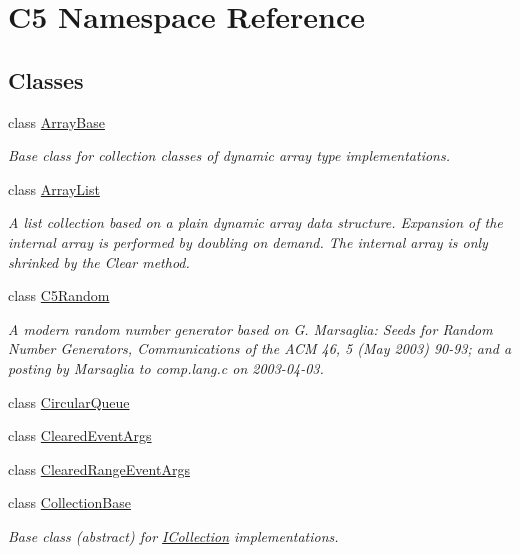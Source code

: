 \hypertarget{namespace_c5}{}\section{C5 Namespace Reference}
\label{namespace_c5}
\subsection*{Classes}
\begin{DoxyCompactItemize}
\item 
class \hyperlink{class_c5_1_1_array_base}{Array\+Base}
\begin{DoxyCompactList}\small\item\em Base class for collection classes of dynamic array type implementations. \end{DoxyCompactList}\item 
class \hyperlink{class_c5_1_1_array_list}{Array\+List}
\begin{DoxyCompactList}\small\item\em A list collection based on a plain dynamic array data structure. Expansion of the internal array is performed by doubling on demand. The internal array is only shrinked by the Clear method. \end{DoxyCompactList}\item 
class \hyperlink{class_c5_1_1_c5_random}{C5\+Random}
\begin{DoxyCompactList}\small\item\em A modern random number generator based on G. Marsaglia\+: Seeds for Random Number Generators, Communications of the A\+C\+M 46, 5 (May 2003) 90-\/93; and a posting by Marsaglia to comp.\+lang.\+c on 2003-\/04-\/03. \end{DoxyCompactList}\item 
class \hyperlink{class_c5_1_1_circular_queue}{Circular\+Queue}
\item 
class \hyperlink{class_c5_1_1_cleared_event_args}{Cleared\+Event\+Args}
\item 
class \hyperlink{class_c5_1_1_cleared_range_event_args}{Cleared\+Range\+Event\+Args}
\item 
class \hyperlink{class_c5_1_1_collection_base}{Collection\+Base}
\begin{DoxyCompactList}\small\item\em Base class (abstract) for \hyperlink{interface_c5_1_1_i_collection}{I\+Collection} implementations. \end{DoxyCompactList}\item 

\end{DoxyCompactItemize}
